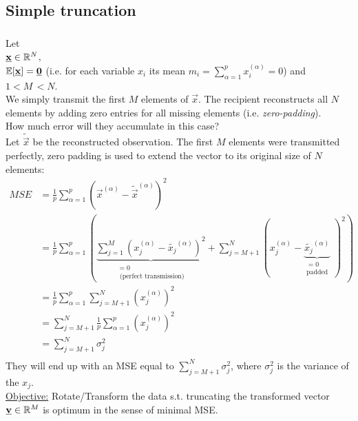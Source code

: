 \subsection{Simple truncation}
\begin{frame}\frametitle{\subsecname}

Let\\[0.2cm]
$\underline{\mathbf{x}} \in \mathbb{R}^N$,\\
$\mathbb{E}[\underline{\mathbf{x}}] = \underline{\mathbf{0}}$ (i.e. for each variable $x_i$ its mean $m_i = \sum_{\alpha=1}^{p} x_i^{(\alpha)} = 0$) and $1 < M\, < N$.\\[0.2cm]
We simply transmit the first $M$ elements of $\vec x$. The recipient reconstructs all $N$ elements by adding zero entries for all missing elements (i.e. \textit{zero-padding}).\\[0.2cm]
How much error will they accumulate in this case?\\[0.2cm]
Let $\widetilde{\vec{x}}$ be the reconstructed observation. The first $M$ elements were transmitted perfectly, zero padding is used to extend the vector to its original size of $N$ elements:
\begin{align*}
MSE  &=  \frac{1}{p} \sum\limits_{\alpha = 1}^p ( \vec{x}^{(\alpha)} - \widetilde{\vec{x}}^{(\alpha)} )^2\\
     &=  \frac{1}{p} \sum\limits_{\alpha = 1}^p \left(\underbrace{\sum\limits_{j = 1}^M ( x_j^{(\alpha)} - \widetilde{x_j}^{(\alpha)} )^2}_{\substack{=0 \\\text{ (perfect transmission)}}} + \sum\limits_{j = M+1}^N ( x_j^{(\alpha)} - \underbrace{\widetilde{x_j}^{(\alpha)}}_{\substack{=0\\ \text{padded}}}\;)^2 \right)\\
     &=  \frac{1}{p} \sum\limits_{\alpha = 1}^p \sum\limits_{j = M+1}^N ( x_j^{(\alpha)} )^2 \\
     &=  \sum\limits_{j = M+1}^N \frac{1}{p} \sum\limits_{\alpha = 1}^p  ( x_j^{(\alpha)} )^2 \\
     &=  \sum\limits_{j = M+1}^N \sigma_j^2 \\
\end{align*}
They will end up with an MSE equal to $\sum_{j=M+1}^{N} \sigma_j^2$, where $\sigma_j^2$ is the variance of the $x_j$.\\

\underline{Objective:} Rotate/Transform the data s.t. truncating the transformed vector $\underline{\mathbf{v}} \in \mathbb{R}^M$ is optimum in the sense of minimal MSE.

\end{frame}

